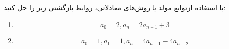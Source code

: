     \p 
   با استفاده ازتوابع مولد یا روش‌های معادلاتی، روابط بازگشتی زیر را حل کنید:
   \begin{enumerate}
   \item
   $$a_0 = 2, a_n = 2a_{n-1} + 3$$
   \item
   $$a_0 = 1, a_1 = 1, a_n = 4a_{n-1} - 4a_{n-2}$$
   \end{enumerate}